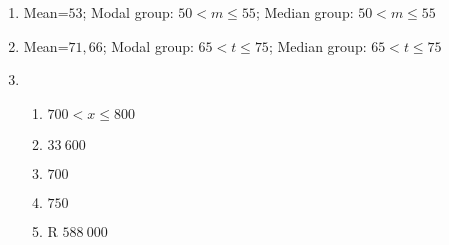  \begin{solutions}{}{
\begin{enumerate}[itemsep=5pt, label=\textbf{\arabic*}. ] 


\item Mean=$53$; Modal group: $50<m \leq 55$; Median group: $50 < m \leq 55$
\item Mean=$71,66$; Modal group: $65 < t \leq 75$; Median group: $65 < t \leq 75$
\item
\begin{enumerate}[noitemsep, label=\textbf{(\alph*)} ]
\item $700 < x\leq800$%
\item $33~600$%
\item $700$ %
\item $750$%
\item R $588~ 000$%
\end{enumerate}
\end{enumerate}}
\end{solutions}

